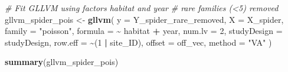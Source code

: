 \documentclass[
]{article}
\newenvironment{Shaded}{\begin{snugshade}}{\end{snugshade}}
\newcommand{\AttributeTok}[1]{\textcolor[rgb]{0.13,0.29,0.53}{#1}}
\newcommand{\CommentTok}[1]{\textcolor[rgb]{0.56,0.35,0.01}{\textit{#1}}}
\newcommand{\DecValTok}[1]{\textcolor[rgb]{0.00,0.00,0.81}{#1}}
\newcommand{\FunctionTok}[1]{\textcolor[rgb]{0.13,0.29,0.53}{\textbf{#1}}}
\newcommand{\NormalTok}[1]{#1}
\newcommand{\OtherTok}[1]{\textcolor[rgb]{0.56,0.35,0.01}{#1}}
\newcommand{\SpecialCharTok}[1]{\textcolor[rgb]{0.81,0.36,0.00}{\textbf{#1}}}
\newcommand{\StringTok}[1]{\textcolor[rgb]{0.31,0.60,0.02}{#1}}
\begin{document}
\begin{Shaded}
\begin{Highlighting}[]
\CommentTok{\# Fit GLLVM using factors habitat and year}
\CommentTok{\# rare families (\textless{}5) removed}
\NormalTok{gllvm\_spider\_pois }\OtherTok{\textless{}{-}} \FunctionTok{gllvm}\NormalTok{(}
  \AttributeTok{y =}\NormalTok{ Y\_spider\_rare\_removed,}
  \AttributeTok{X =}\NormalTok{ X\_spider,                        }
  \AttributeTok{family =} \StringTok{"poisson"}\NormalTok{, }
  \AttributeTok{formula =} \SpecialCharTok{\textasciitilde{}}\NormalTok{ habitat }\SpecialCharTok{+}\NormalTok{ year,}
  \AttributeTok{num.lv =} \DecValTok{2}\NormalTok{,}
  \AttributeTok{studyDesign =}\NormalTok{ studyDesign,}
  \AttributeTok{row.eff =} \SpecialCharTok{\textasciitilde{}}\NormalTok{(}\DecValTok{1} \SpecialCharTok{|}\NormalTok{ site\_ID),}
  \AttributeTok{offset =}\NormalTok{ off\_vec,   }
  \AttributeTok{method =} \StringTok{"VA"}
\NormalTok{)}

\FunctionTok{summary}\NormalTok{(gllvm\_spider\_pois)}
\end{Highlighting}
\end{Shaded}
\end{document}
